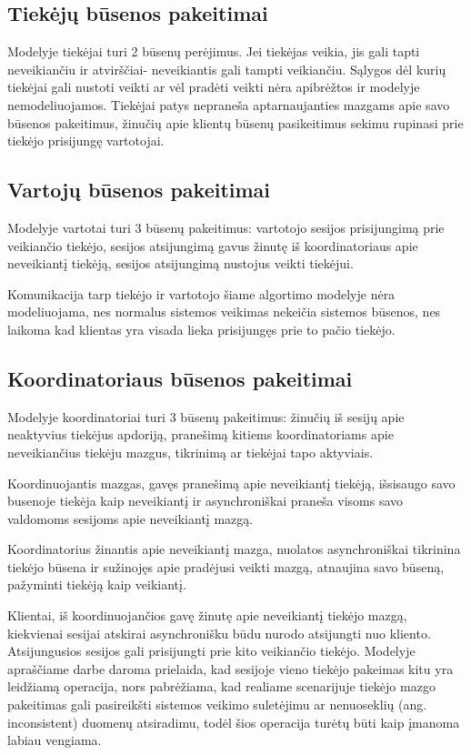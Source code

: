 \subsection{Tiekėjų būsenos pakeitimai}

Modelyje tiekėjai turi 2 būsenų perėjimus.
Jei tiekėjas veikia, jis gali tapti neveikiančiu ir atvirščiai- neveikiantis gali tampti veikiančiu.
Sąlygos dėl kurių tiekėjai gali nustoti veikti ar vėl pradėti veikti nėra apibrėžtos ir modelyje nemodeliuojamos.
Tiekėjai patys nepraneša aptarnaujanties mazgams apie savo būsenos pakeitimus, 
žinučių apie klientų būsenų pasikeitimus sekimu rupinasi prie tiekėjo prisijungę vartotojai.

\subsection{Vartojų būsenos pakeitimai}

Modelyje vartotai turi 3 būsenų pakeitimus: 
vartotojo sesijos prisijungimą prie veikiančio tiekėjo, 
sesijos atsijungimą gavus žinutę iš koordinatoriaus apie neveikiantį tiekėją,
sesijos atsijungimą nustojus veikti tiekėjui.

Komunikacija tarp tiekėjo ir vartotojo šiame algortimo modelyje nėra modeliuojama, 
 nes normalus sistemos veikimas nekeičia sistemos būsenos, 
 nes laikoma kad klientas yra visada lieka prisijungęs prie to pačio tiekėjo. 


\subsection{Koordinatoriaus būsenos pakeitimai}

Modelyje koordinatoriai turi 3 būsenų pakeitimus: 
žinučių iš sesijų apie neaktyvius tiekėjus apdoriją,
pranešimą kitiems koordinatoriams apie neveikiančius tiekėju mazgus,
tikrinimą ar tiekėjai tapo aktyviais.

Koordinuojantis mazgas, gavęs pranešimą apie neveikiantį tiekėją,
 išsisaugo savo busenoje tiekėja kaip neveikiantį 
 ir asynchroniškai praneša visoms savo valdomoms sesijoms apie neveikiantį mazgą.

Koordinatorius žinantis apie neveikiantį mazga, 
 nuolatos asynchroniškai tikrinina tiekėjo būsena ir
 sužinojęs apie pradėjusi veikti mazgą, atnaujina savo būseną,
 pažyminti tiekėją kaip veikiantį.

Klientai, iš koordinuojančios gavę žinutę apie neveikiantį tiekėjo mazgą,
 kiekvienai sesijai atskirai asynchronišku būdu nurodo atsijungti nuo kliento.
Atsijungusios sesijos gali prisijungti prie kito veikiančio tiekėjo.
Modelyje apraščiame darbe \cite{petrauskas2018asynchronous} daroma prielaida, 
 kad sesijoje vieno tiekėjo pakeimas kitu yra leidžiamą operacija, 
 nors pabrėžiama, kad realiame scenarijuje tiekėjo mazgo pakeitimas gali 
 pasireikšti sistemos veikimo suletėjimu ar nenuoseklių (ang. inconsistent) duomenų atsiradimu, 
 todėl šios operacija turėtų būti kaip įmanoma labiau vengiama.

